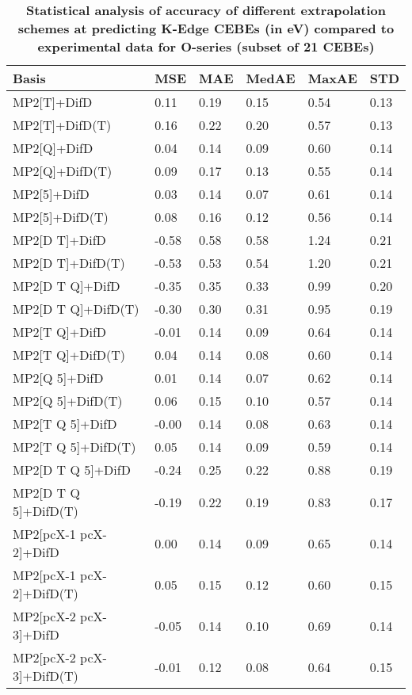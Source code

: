 \begin{table}
  \caption{\textbf{Statistical analysis of accuracy of different extrapolation schemes at predicting K-Edge CEBEs (in eV) compared to experimental data for O-series (subset of 21 CEBEs)}}
  \begin{tabular}{l l l l l l }
    \toprule
    \textbf{Basis} & \textbf{MSE} & \textbf{MAE} & \textbf{MedAE} & \textbf{MaxAE} & \textbf{STD} \\ 
    \midrule
    MP2[T]+DifD & 0.11 & 0.19 & 0.15 & 0.54 & 0.13 \\ 
    MP2[T]+DifD(T) & 0.16 & 0.22 & 0.20 & 0.57 & 0.13 \\ 
    MP2[Q]+DifD & 0.04 & 0.14 & 0.09 & 0.60 & 0.14 \\ 
    MP2[Q]+DifD(T) & 0.09 & 0.17 & 0.13 & 0.55 & 0.14 \\ 
    MP2[5]+DifD & 0.03 & 0.14 & 0.07 & 0.61 & 0.14 \\ 
    MP2[5]+DifD(T) & 0.08 & 0.16 & 0.12 & 0.56 & 0.14 \\ 
    MP2[D T]+DifD & -0.58 & 0.58 & 0.58 & 1.24 & 0.21 \\ 
    MP2[D T]+DifD(T) & -0.53 & 0.53 & 0.54 & 1.20 & 0.21 \\ 
    MP2[D T Q]+DifD & -0.35 & 0.35 & 0.33 & 0.99 & 0.20 \\ 
    MP2[D T Q]+DifD(T) & -0.30 & 0.30 & 0.31 & 0.95 & 0.19 \\ 
    MP2[T Q]+DifD & -0.01 & 0.14 & 0.09 & 0.64 & 0.14 \\ 
    MP2[T Q]+DifD(T) & 0.04 & 0.14 & 0.08 & 0.60 & 0.14 \\ 
    MP2[Q 5]+DifD & 0.01 & 0.14 & 0.07 & 0.62 & 0.14 \\ 
    MP2[Q 5]+DifD(T) & 0.06 & 0.15 & 0.10 & 0.57 & 0.14 \\ 
    MP2[T Q 5]+DifD & -0.00 & 0.14 & 0.08 & 0.63 & 0.14 \\ 
    MP2[T Q 5]+DifD(T) & 0.05 & 0.14 & 0.09 & 0.59 & 0.14 \\ 
    MP2[D T Q 5]+DifD & -0.24 & 0.25 & 0.22 & 0.88 & 0.19 \\ 
    MP2[D T Q 5]+DifD(T) & -0.19 & 0.22 & 0.19 & 0.83 & 0.17 \\ 
    MP2[pcX-1 pcX-2]+DifD & 0.00 & 0.14 & 0.09 & 0.65 & 0.14 \\ 
    MP2[pcX-1 pcX-2]+DifD(T) & 0.05 & 0.15 & 0.12 & 0.60 & 0.15 \\ 
    MP2[pcX-2 pcX-3]+DifD & -0.05 & 0.14 & 0.10 & 0.69 & 0.14 \\ 
    MP2[pcX-2 pcX-3]+DifD(T) & -0.01 & 0.12 & 0.08 & 0.64 & 0.15 \\ 

\end{tabular}
\end{table}
